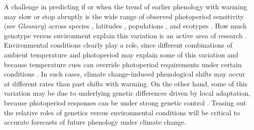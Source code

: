 \documentclass{article}
\begin{document}

 \par A challenge in predicting if or when the trend of earlier phenology with warming may slow or stop abruptly is the wide range of observed photoperiod sensitivity (see \emph{Glossary}) across species \citep{flynn2018,zohner2016,Sanz-Perez:2009aa}, latitudes \citep{ettinger2020,Partanen:2005aa,johnsen1996}, populations \citep{gauzere2017,saikkonen2012,Caffarra:2011b,bradshaw2007,Vihera-Aarnio:2006aa}, and ecotypes \citep{Howe:1995aa}. How much genotype versus environment explain this variation is an active area of research \citep[e.g.,][]{frejaville2019,franks2014,gould2010,mimura2010}. Environmental conditions clearly play a role, since different combinations of ambient temperature and photoperiod may explain some of this variation and because temperature cues can override photoperiod requirements under certain conditions \citep [e.g.,][] {tanino2010}. In such cases, climate change-induced phenological shifts may occur at different rates than past shifts with warming. On the other hand, some of this variation may be due to underlying genetic differences driven by local adaptation, because photoperiod responses can be under strong genetic control \citep[][see also Boxes 1, 2]{bradshaw1995,keller2011,weih2004}. Teasing out the relative roles of genetics versus environmental conditions will be critical to accurate forecasts of future phenology under climate change.
\end{document}
